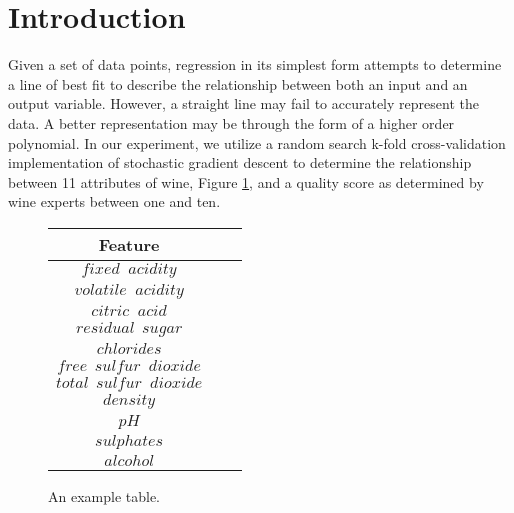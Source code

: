 
\section{Introduction}
\label{sec:intro}

Given a set of data points, regression in its simplest form attempts to 
determine a line of best fit to describe the relationship between both an
input and an output variable. However, a straight line may fail to
accurately represent the data. A better representation may be through
the form of a higher order polynomial. In our experiment, we utilize
a random search k-fold cross-validation implementation of stochastic
gradient descent to determine the relationship between 11 attributes of wine,
Figure \ref{tab:attributes}, and a quality score as determined by wine experts
between one and ten.

\begin{figure}[htb]
  \centering %

  \begin{tabular}{|c|c|c|} 
    \hline \hline %
    Feature \\ %
    \hline %
    $fixed \phantom aacidity$\\
    $volatile   \phantom  aacidity$\\
    $citric   \phantom aacid$\\
    $residual   \phantom ssugar$\\
    $chlorides$\\
    $free   \phantom ssulfur \phantom ddioxide$\\
    $total  \phantom ssulfur  \phantom ddioxide$\\
    $density$\\
    $pH$\\
    $sulphates$\\
    $alcohol$\\
    \hline \hline
  \end{tabular}

  \caption{An example table.}
  \label{tab:attributes}
\end{figure}

